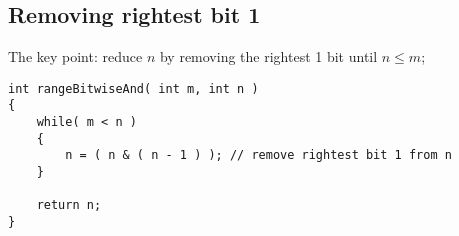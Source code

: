 \subsection{Removing rightest bit 1}
The key point: reduce $n$ by removing the rightest 1 bit until $n\leq m$;
\begin{lstlisting}[style=customc, caption={Remove rightest bit 1}]
int rangeBitwiseAnd( int m, int n )
{
    while( m < n )
    {
        n = ( n & ( n - 1 ) ); // remove rightest bit 1 from n
    }

    return n;
}
\end{lstlisting}